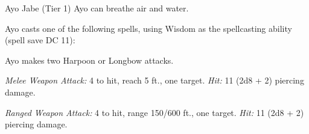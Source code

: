 \documentclass[10pt,a4paper,twoside,bg=print,twocolumn,openany,nodeprecatedcode]{dndbook}
\begin{document}
\begin{DndMonster}[float=t]{Ayo Jabe (Tier 1)}
\DndMonsterBasics[
armor-class = {14 (studded leather armor)},
hit-points = {\DndDice{10d8 + 20}},
speed = {30 ft., swim 30 ft.}
]
\DndMonsterAbilityScores[
 str = 14,
 dex = 14,
 con = 14,
 int = 10,
 wis = 12,
 cha = 12
]
\DndMonsterDetails[
saving-throws = {Str +4, Dex +4},
skills = {Athletics +4, Perception +3, Survival +3},
damage-resistances = {acid},
languages = {Common, Goblin, Orc},
challenge = 3,
]
Ayo can breathe air and water.

Ayo casts one of the following spells, using Wisdom as the spellcasting ability (spell save DC 11):
\begin{DndMonsterSpells}
\end{DndMonsterSpells}
Ayo makes two Harpoon or Longbow attacks.

\textsl{Melee Weapon Attack:} 4 to hit, reach 5 ft., one target. \textsl{Hit:} 11 (2d8 + 2) piercing damage.

\textsl{Ranged Weapon Attack:} 4 to hit, range 150/600 ft., one target. \textsl{Hit:} 11 (2d8 + 2) piercing damage.

\end{DndMonster}
\end{document}
